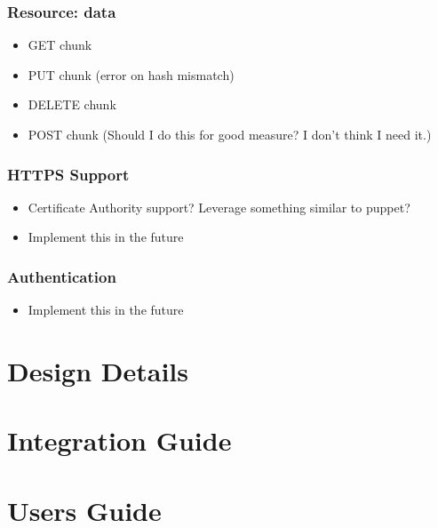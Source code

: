 \documentclass[letterpaper]{article}
\begin{document}
\subsubsection{Resource: data}

\begin{itemize}
\item
GET chunk

\item
PUT chunk (error on hash mismatch)

\item
DELETE chunk

\item
POST chunk (Should I do this for good measure?  I don't think I need it.)
\end{itemize}

\subsubsection{HTTPS Support}

\begin{itemize}
\item
Certificate Authority support?  Leverage something similar to puppet?

\item
Implement this in the future
\end{itemize}

\subsubsection{Authentication}

\begin{itemize}
\item
Implement this in the future
\end{itemize}

\section{Design Details}

\section{Integration Guide}

\section{Users Guide}

\end{document}
